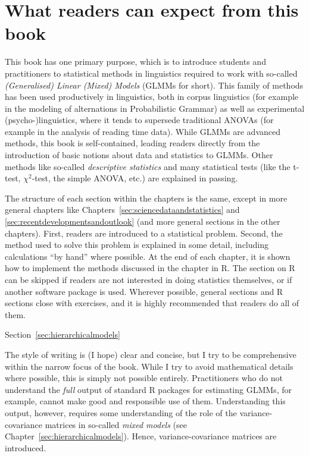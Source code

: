 
\section*{What readers can expect from this book}

This book has one primary purpose, which is to introduce students and practitioners to statistical methods in linguistics required to work with so-called \textit{(Generalised) Linear (Mixed) Models} (GLMMs for short).
This family of methods has been used productively in linguistics, both in corpus linguistics (for example in the modeling of alternations in Probabilistic Grammar) as well as experimental (psycho-)linguistics, where it tends to supersede traditional ANOVAs (for example in the analysis of reading time data).
While GLMMs are advanced methods, this book is self-contained, leading readers directly from the introduction of basic notions about data and statistics to GLMMs.
Other methods like so-called \textit{descriptive statistics} and many statistical tests (like the t-test, $\chi^2$-test, the simple ANOVA, etc.) are explained in passing.

The structure of each section within the chapters is the same, except in more general chapters like Chapters~\ref{sec:sciencedataandstatistics} and \ref{sec:recentdevelopmentsandoutlook} (and more general sections in the other chapters).
First, readers are introduced to a statistical problem.
Second, the method used to solve this problem is explained in some detail, including calculations ``by hand'' where possible.
At the end of each chapter, it is shown how to implement the methods discussed in the chapter in R.
The section on R can be skipped if readers are not interested in doing statistics themselves, or if another software package is used.
Wherever possible, general sections and R sections close with exercises, and it is highly recommended that readers do all of them.

Section~\ref{sec:hierarchicalmodels}

The style of writing is (I hope) clear and concise, but I try to be comprehensive within the narrow focus of the book.
While I try to avoid mathematical details where possible, this is simply not possible entirely.
Practitioners who do not understand the \textit{full} output of standard R packages for estimating GLMMs, for example, cannot make good and responsible use of them.
Understanding this output, however, requires some understanding of the role of the variance-covariance matrices in so-called \textit{mixed models} (see Chapter~\ref{sec:hierarchicalmodels}).
Hence, variance-covariance matrices are introduced.


